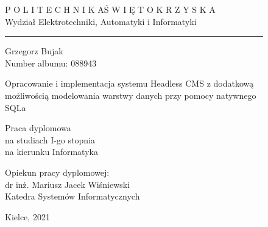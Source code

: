 \begin{figure}
    \arialnarrowbold
    \bfseries

    \centering
    \Large P O L I T E C H N I K A\quad Ś W I Ę T O K R Z Y S K A \\
    Wydział Elektrotechniki, Automatyki i Informatyki\\
    \rule{\linewidth}{1pt}

    \vspace{4cm}

    Grzegorz Bujak\\
    Number albumu: 088943\\
    \vspace{2cm}

    \LARGE Opracowanie i implementacja systemu Headless CMS 
    z dodatkową możliwością modelowania
    warstwy danych przy pomocy natywnego SQLa\\
    \vspace{1cm}

    \large Praca dyplomowa\\
    na studiach I-go stopnia\\
    na kierunku Informatyka\\
    \vspace{4cm}

    \normalfont
    \arialnarrow
    \raggedleft Opiekun pracy dyplomowej:\\
    dr inż. Mariusz Jacek Wiśniewski\\
    Katedra Systemów Informatycznych\\
    \vspace{1.5cm}

    \centering
    Kielce, 2021
\end{figure}

\vspace{1cm}

\clearpage

